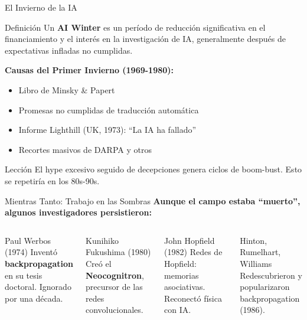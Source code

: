 \documentclass[aspectratio=169]{beamer}
\begin{document}
\begin{frame}{El Invierno de la IA}
    \begin{block}{Definición}
        Un \textbf{AI Winter} es un período de reducción significativa en el financiamiento y el interés en la investigación de IA, generalmente después de expectativas infladas no cumplidas.
    \end{block}
    
    \vspace{0.3cm}
    \textbf{Causas del Primer Invierno (1969-1980):}
    \begin{itemize}
        \item Libro de Minsky \& Papert
        \item Promesas no cumplidas de traducción automática
        \item Informe Lighthill (UK, 1973): ``La IA ha fallado''
        \item Recortes masivos de DARPA y otros
    \end{itemize}
    
    \vspace{0.3cm}
    \begin{exampleblock}{Lección}
        El hype excesivo seguido de decepciones genera ciclos de boom-bust. Esto se repetiría en los 80s-90s.
    \end{exampleblock}
\end{frame}

\begin{frame}{Mientras Tanto: Trabajo en las Sombras}
    \textbf{Aunque el campo estaba ``muerto'', algunos investigadores persistieron:}
    
    \vspace{0.3cm}
    \begin{columns}[t]
        \begin{block}{Paul Werbos (1974)}
            Inventó \textbf{backpropagation} en su tesis doctoral. Ignorado por una década.
        \end{block}
        
        \begin{block}{Kunihiko Fukushima (1980)}
            Creó el \textbf{Neocognitron}, precursor de las redes convolucionales.
        \end{block}
        
        \begin{block}{John Hopfield (1982)}
            Redes de Hopfield: memorias asociativas. Reconectó física con IA.
        \end{block}
        
        \begin{block}{Hinton, Rumelhart, Williams}
            Redescubrieron y popularizaron backpropagation (1986).
        \end{block}
    \end{columns}
\end{frame}
\end{document}
